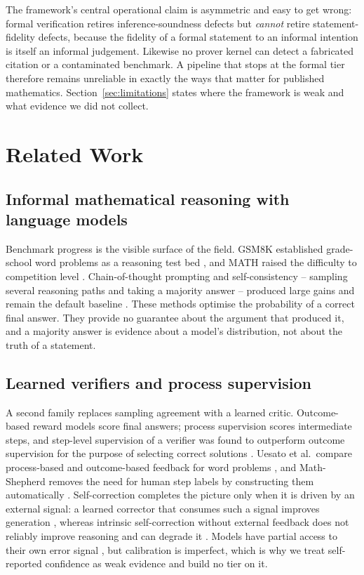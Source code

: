 \documentclass[11pt]{article}
\theoremstyle{plain}
\theoremstyle{definition}
\begin{document}
The framework's central operational claim is asymmetric and easy to get wrong:
formal verification retires inference-soundness defects but \emph{cannot} retire
statement-fidelity defects, because the fidelity of a formal statement to an
informal intention is itself an informal judgement. Likewise no prover kernel can
detect a fabricated citation or a contaminated benchmark. A pipeline that stops at
the formal tier therefore remains unreliable in exactly the ways that matter for
published mathematics. Section~\ref{sec:limitations} states where the framework is
weak and what evidence we did not collect.

\section{Related Work}

\subsection{Informal mathematical reasoning with language models}

Benchmark progress is the visible surface of the field. GSM8K established grade-school
word problems as a reasoning test bed \citep{cobbe2021gsm8k}, and MATH raised the
difficulty to competition level \citep{hendrycks2021math}. Chain-of-thought prompting
and self-consistency -- sampling several reasoning paths and taking a majority answer --
produced large gains and remain the default baseline
\citep{wang2023selfconsistency}. These methods optimise the probability of a correct
final answer. They provide no guarantee about the argument that produced it, and a
majority answer is evidence about a model's distribution, not about the truth of a
statement.

\subsection{Learned verifiers and process supervision}

A second family replaces sampling agreement with a learned critic. Outcome-based reward
models score final answers; process supervision scores intermediate steps, and step-level
supervision of a verifier was found to outperform outcome supervision for the purpose of
selecting correct solutions \citep{lightman2023verify}. Uesato et al.\ compare
process-based and outcome-based feedback for word problems \citep{uesato2022process}, and
Math-Shepherd removes the need for human step labels by constructing them automatically
\citep{wang2024mathshepherd}. Self-correction completes the picture only when it is driven
by an external signal: a learned corrector that consumes such a signal improves generation
\citep{welleck2022selfcorrect}, whereas intrinsic self-correction without external feedback
does not reliably improve reasoning and can degrade it \citep{huang2024selfcorrect}. Models
have partial access to their own error signal \citep{kadavath2022know}, but calibration is
imperfect, which is why we treat self-reported confidence as weak evidence and build no
tier on it.
\end{document}
